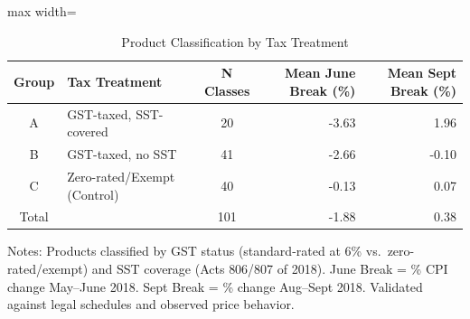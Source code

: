\begin{table}[H]
\centering
\caption{Product Classification by Tax Treatment}
\label{tab:classification}
\begin{adjustbox}{max width=\textwidth}
\begin{threeparttable}
\begin{tabular}{clcrr}
\toprule
Group & Tax Treatment & N Classes & Mean June Break (\%) & Mean Sept Break (\%) \\
\midrule
A & GST-taxed, SST-covered & 20 & -3.63 & 1.96 \\
B & GST-taxed, no SST & 41 & -2.66 & -0.10 \\
C & Zero-rated/Exempt (Control) & 40 & -0.13 & 0.07 \\
\midrule
Total & & 101 & -1.88 & 0.38 \\
\bottomrule
\end{tabular}
\begin{tablenotes}[flushleft]
\small
\item Notes: Products classified by GST status (standard-rated at 6\% vs.\ zero-rated/exempt) and SST coverage (Acts 806/807 of 2018). June Break = \% CPI change May--June 2018. Sept Break = \% change Aug--Sept 2018. Validated against legal schedules and observed price behavior.
\end{tablenotes}
\end{threeparttable}
\end{adjustbox}
\end{table}

